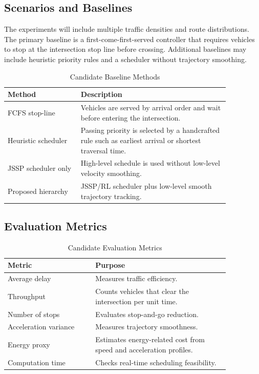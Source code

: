 \subsection{Scenarios and Baselines}
The experiments will include multiple traffic densities and route distributions. The primary baseline is a first-come-first-served controller that requires vehicles to stop at the intersection stop line before crossing. Additional baselines may include heuristic priority rules and a scheduler without trajectory smoothing.

\begin{table}[!t]
\caption{Candidate Baseline Methods}
\label{tab:baselines}
\centering
\renewcommand{\arraystretch}{1.15}
\begin{tabular}{p{0.28\linewidth}p{0.58\linewidth}}
\toprule
\textbf{Method} & \textbf{Description} \\
\midrule
FCFS stop-line & Vehicles are served by arrival order and wait before entering the intersection. \\
Heuristic scheduler & Passing priority is selected by a handcrafted rule such as earliest arrival or shortest traversal time. \\
JSSP scheduler only & High-level schedule is used without low-level velocity smoothing. \\
Proposed hierarchy & JSSP/RL scheduler plus low-level smooth trajectory tracking. \\
\bottomrule
\end{tabular}
\end{table}

\subsection{Evaluation Metrics}
\begin{table}[!t]
\caption{Candidate Evaluation Metrics}
\label{tab:metrics}
\centering
\renewcommand{\arraystretch}{1.15}
\begin{tabular}{p{0.34\linewidth}p{0.52\linewidth}}
\toprule
\textbf{Metric} & \textbf{Purpose} \\
\midrule
Average delay & Measures traffic efficiency. \\
Throughput & Counts vehicles that clear the intersection per unit time. \\
Number of stops & Evaluates stop-and-go reduction. \\
Acceleration variance & Measures trajectory smoothness. \\
Energy proxy & Estimates energy-related cost from speed and acceleration profiles. \\
Computation time & Checks real-time scheduling feasibility. \\
\bottomrule
\end{tabular}
\end{table}


